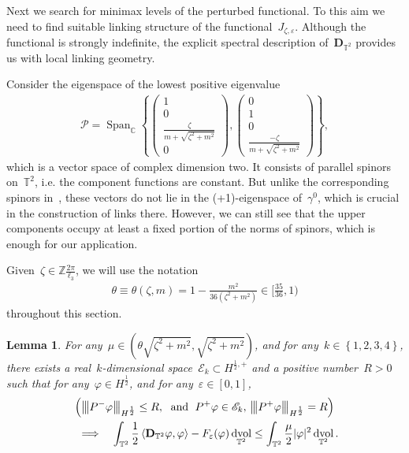 \documentclass[11pt,final]{amsart}
\newcommand{\tnorm}[1]{%
  \left\vert\kern-0.3ex\left\vert\kern-0.3ex\left\vert #1 \right\vert\kern-0.3ex\right\vert\kern-0.3ex\right\vert
}
\newcommand{\C}{\mathbb{C}}
\newcommand{\T}{\mathbb{T}}
\newcommand{\dd}{\mathop{}\!\mathrm{d}}
\newcommand{\eps}{\varepsilon}
\newcommand{\pD}{\mathbf{D}}
\newcommand{\Abracket}[1]{\left<#1\right>} %
\newcommand{\parenthesis}[1]{\left(#1\right)} %
\newcommand{\braces}[1]{\left\{#1\right\}} %
\newcommand{\bZ}{\mathbb{Z}}
\DeclareMathOperator{\dv}{\dd{vol}}
\DeclareMathOperator{\Span}{Span}
\newtheorem{lemma}[thm]{Lemma}
\begin{document}
Next we search for minimax levels of the perturbed functional.
To this aim we need to find suitable linking structure of the functional~$J_{\zeta,\eps}$.
Although the functional is strongly indefinite, the explicit spectral description of~$\pD_{\T^2}$ provides us with local linking geometry. 


Consider the eigenspace of the lowest positive eigenvalue
\begin{align}
        \mathscr{P}= \Span_{\C}\braces{ \begin{pmatrix} 1 \\ 0 \\\frac{\zeta}{ m+\sqrt{\zeta^2+m^2} } \\ 0  \end{pmatrix},
        \begin{pmatrix} 0 \\ 1 \\ 0 \\ \frac{-\zeta}{m+\sqrt{\zeta^2+m^2}} \end{pmatrix} },
\end{align}
which is a vector space of complex dimension two.
It consists of parallel spinors on~$\T^2$, i.e. the component functions are constant.
But unlike the corresponding spinors in~\cite{WZ2026Stationary}, these vectors do not lie in the (+1)-eigenspace of~$\gamma^0$, which is crucial in the construction of links there.
However, we can still see that the upper components occupy at least a fixed portion of the norms of spinors, which is enough for our application.

Given~$\zeta\in\bZ\frac{2\pi}{\ell_3}$, we will use the notation
\begin{align}
    \theta\equiv \theta(\zeta,m)=1-\frac{m^2}{36(\zeta^2+m^2)}\in [\frac{35}{36},1)
\end{align}
throughout this section. 

\begin{lemma}\label{lemma:local control}
    For any~$\mu \in  (\theta\sqrt{\zeta^2+m^2},\sqrt{\zeta^2+m^2})$, and for any~$k\in\braces{1,2,3,4}$, there exists a real~$k$-dimensional space~$\mathscr{E}_{k}\subset H^{\frac{1}{2},+}$ and a positive number~$R>0$ such that for any~$\varphi\in H^{\frac{1}{2}}$, and for any~$\eps\in [0,1]$,
    \begin{multline}
        \parenthesis{ \tnorm{P^-\varphi}_{H^{\frac{1}{2}}} \leq R, \; \mbox{ and }\;  P^+\varphi\in\mathscr{E}_{k}, \, \tnorm{P^+\varphi }_{H^{\frac{1}{2}}}=R }  \\
        \quad \Longrightarrow  \quad
        \int_{\T^2} \frac{1}{2}\Abracket{\pD_{\T^2}\varphi,\varphi}-F_\eps(\varphi) \dv_{\T^2} \leq \int_{\T^2} \frac{\mu}{2}|\varphi|^2 \dv_{\T^2}.
    \end{multline}
\end{lemma}
\end{document}
